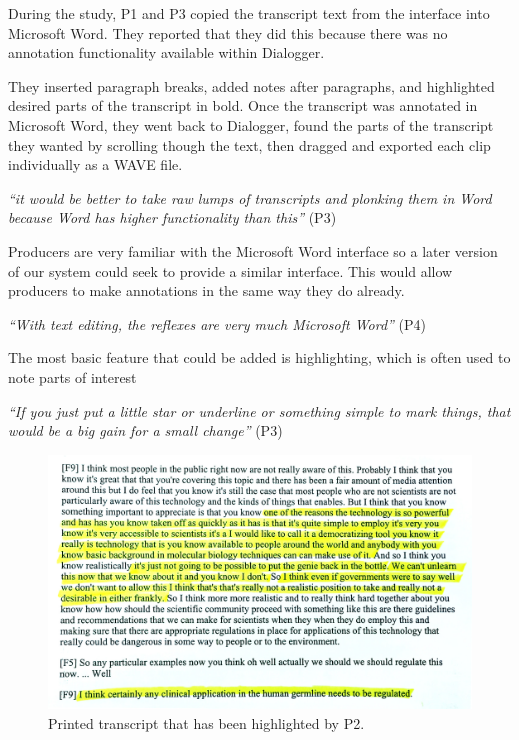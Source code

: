 During the study, P1 and P3 copied the transcript text from the interface into Microsoft Word. They
reported that they did this because there was no annotation functionality
available within Dialogger.

They inserted paragraph breaks, added notes after paragraphs, and
highlighted desired parts of the transcript in bold. Once the transcript was
annotated in Microsoft Word, they went back to Dialogger, found the parts of the
transcript they wanted by scrolling though the text, then dragged and
exported each clip individually as a WAVE file.

\textit{``it would be better to take raw lumps of transcripts and plonking them
  in Word because Word has higher functionality than this''} (P3)

Producers are very familiar with the Microsoft Word interface so a later version of our
system could seek to provide a similar interface. This would allow producers to make annotations in the same way they
do already.

\textit{``With text editing, the reflexes are very much Microsoft Word''} (P4)

The most basic feature that could be added is highlighting, which is often used to note parts of interest

\textit{``If you just put a little star or underline or something simple to
  mark things, that would be a big gain for a small change''} (P3)




\begin{figure}
\centering
  \includegraphics[width=\columnwidth]{figs/highlighting-cropped.jpg}
  \caption{Printed transcript that has been highlighted by P2.}
  \label{fig:highlight}
\end{figure}

